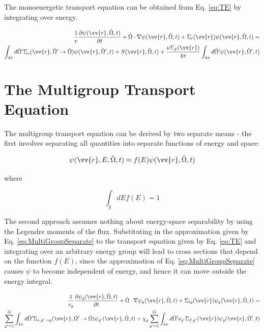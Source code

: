 \documentclass[10pt]{article}
\newcommand{\hO}{\hat{\Omega}}
\newcommand{\spa}{(\vv{r}, E, \hO, t)}
\begin{document}
\begin{flushleft}
The monoenergetic transport equation can be obtained from Eq. \eqref{eq:TE} by integrating over energy. 

\begin{equation}
\label{eq:TEMonoenergetic}
\begin{aligned}
\frac{1}{v} \frac{\partial\psi(\vv{r},\hO  ,t)}{\partial t} +
 \hO  \cdot\nabla\psi(\vv{r}, \hO  ,t) + 
 \Sigma_t(\vv{r})\psi(\vv{r}, \hO  ,t) = \\
\int_{4\pi}^{ } d\hO  ' \Sigma_s(\vv{r}, \hO  '\rightarrow\hO  )\psi(\vv{r}, \hO  ',t) + S(\vv{r}, \hO  ,t)+\frac{\nu\Sigma_f(\vv{r})}{4\pi} \int_{4\pi}^{} d\hO  '\psi(\vv{r},\hO  ',t)\\
\end{aligned}
\end{equation}

\clearpage

\section{The Multigroup Transport Equation}

The multigroup transport equation can be derived by two separate means - the first involves separating all quantities into separate functions of energy and space:

\begin{equation}
\label{eq:MultiGroupSeparate}
\psi\spa  \approx f(E)\psi(\vv{r}, \hO  ,t)
\end{equation}

where

\begin{equation}
\label{eq:f_E_normalized}
\int_{g} dEf(E) = 1
\end{equation}

The second approach assumes nothing about energy-space separability by using the Legendre moments of the flux. Substituting in the approximation given by Eq. \ref{eq:MultiGroupSeparate} to the transport equation given by Eq. \ref{eq:TE} and integrating over an arbitrary energy group will lead to cross sections that depend on the function \(f(E)\), since the approximation of Eq. \ref{eq:MultiGroupSeparate} causes \(\psi\) to become independent of energy, and hence it can move outside the energy integral.

\begin{equation}
\label{eq:multigroupTE1}
\begin{aligned}
\frac{1}{v_g}\frac{\partial \psi_g(\vv{r}, \hO  , t)}{\partial t} + \hO  \cdot\nabla\psi_g(\vv{r}, \hO  , t) + \Sigma_{tg}(\vv{r})\psi_g(\vv{r}, \hO  , t) =\\
\sum_{g'=1}^{G} \int_{4\pi}^{} d\hO  ' \Sigma_{s, g'\rightarrow g}(\vv{r}, \hO  ' \rightarrow\hO  )\psi_{g'}(\vv{r}, \hO  , t) + \chi_g \sum_{g'=1}^{G}\int_{4\pi}^{} d\hO  ' \nu_{g'}\Sigma_{f,g'}(\vv{r})\psi_g(\vv{r}, \hO  ', t)
\end{aligned}
\end{equation}


\end{flushleft}
\end{document}
